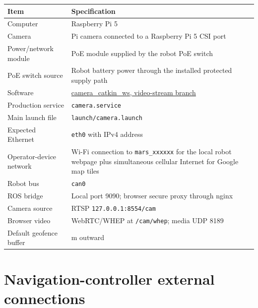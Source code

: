 \documentclass[
  10pt,
  letterpaper,
  openany]{report}
\newcounter{none} %
\begin{document}
{\def\LTcaptype{none} %
\begin{longtable}[]{@{}
  >{\raggedright\arraybackslash}p{}
  >{\raggedright\arraybackslash}p{}@{}}
\toprule\noalign{}
\begin{minipage}[b]{\linewidth}\raggedright
Item
\end{minipage} & \begin{minipage}[b]{\linewidth}\raggedright
Specification
\end{minipage} \\
\midrule\noalign{}
\endhead
\bottomrule\noalign{}
\endlastfoot
Computer & Raspberry Pi 5 \\
Camera & Pi camera connected to a Raspberry Pi 5 CSI port \\
Power/network module & PoE module supplied by the robot PoE switch \\
PoE switch source & Robot battery power through the installed protected
supply path \\
Software &
\href{https://github.com/asilan/camera_catkin_ws/tree/video-stream}{camera\_catkin\_ws,
video-stream branch} \\
Production service & \texttt{camera.service} \\
Main launch file & \texttt{launch/camera.launch} \\
Expected Ethernet & \texttt{eth0} with IPv4 address \\
Operator-device network & Wi-Fi connection to \texttt{mars\_xxxxxx} for
the local robot webpage plus simultaneous cellular Internet for Google
map tiles \\
Robot bus & \texttt{can0} \\
ROS bridge & Local port 9090; browser secure proxy through nginx \\
Camera source & RTSP \texttt{127.0.0.1:8554/cam} \\
Browser video & WebRTC/WHEP at \texttt{/cam/whep}; media UDP 8189 \\
Default geofence buffer & 2 m outward \\
\end{longtable}
}

\protect{}\label{nav-connections}
\section{Navigation-controller external
connections}\label{navigation-controller-external-connections}
\end{document}
